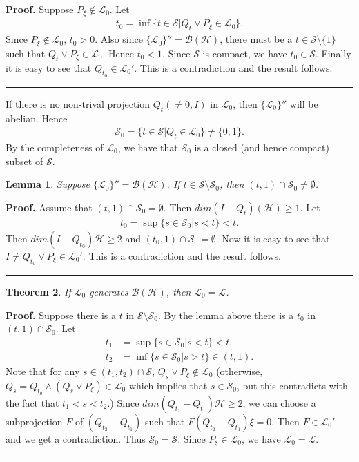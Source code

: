 \documentclass[12pt]{article}
\newtheorem{theorem}{Theorem}
\newtheorem{lemma}[theorem]{Lemma}
\newenvironment{proof}[1][Proof]{\textbf{#1.} }{\ \rule{0.5em}{0.5em}}
\newcommand{\BBB}{\mathcal B}
\newcommand{\HHH}{\mathscr H} %
\newcommand{\LLL}{\mathscr L} %
\newcommand{\SSS}{\mathcal S}
\newcommand{\PP}[1]{ P_{#1}} %
\newcommand{\QQ}[1]{ Q_{#1}}
\begin{document}
\noindent\begin{proof} Suppose $\PP {\xi} \notin \LLL_{0}$. Let
\begin{align*}
t_0 = \inf \{t \in \SSS | \QQ {t} \vee \PP {\xi }  \in \LLL_0 \}.
\end{align*}
Since $\PP {\xi} \notin \LLL_0$, $t_0 > 0$. Also since $\{ \LLL_{0}
\}'' = \BBB(\HHH)$, there must be a $t \in \SSS \setminus \{1 \}$
such that $\QQ {t} \vee \PP {\xi }  \in \LLL_0$. Hence $t_0 < 1$.
Since $\SSS$ is compact, we have $t_0 \in \SSS$. Finally it is easy
to see that $\QQ {t_0} \in \LLL_{0}'$. This is a contradiction and
the result follows. \end{proof}\newline

If there is no non-trival projection $\QQ {t}( \neq 0, I)$ in
$\LLL_{0}$, then $\{\LLL_{0} \}''$ will be abelian. Hence
\begin{align*} \SSS_0 = \{t \in \SSS | \QQ {t} \in \LLL_0 \} \neq
\{0, 1\}.
\end{align*}
By the completeness of $\LLL_0$, we have that $\SSS_0$ is a closed
(and hence compact) subset of $\SSS$.

\begin{lemma}
Suppose $\{ \LLL_{0} \}'' = \BBB(\HHH)$. If $t \in \SSS \setminus
\SSS_0$, then $(t, 1) \cap \SSS_0 \neq \emptyset$.
\end{lemma}

\noindent\begin{proof} Assume that $(t, 1) \cap \SSS_0 = \emptyset$.
Then $dim(I-\QQ {t})(\HHH) \geq 1$. Let
\begin{align*}
t_0 = \sup \{ s \in \SSS_0 | s < t \} < t.
\end{align*}
Then $dim(I-\QQ {t_0})\HHH \geq 2$ and $(t_0, 1) \cap \SSS_0 =
\emptyset$. Now it is easy to see that $I \neq \QQ {t_0} \vee \PP
{\xi } \in \LLL_{0}' $. This is a contradiction and the result
follows.
\end{proof}

\begin{theorem}
If $\LLL_0$ generates $\BBB(\HHH)$, then $\LLL_0 = \LLL$.
\end{theorem}

\noindent\begin{proof} Suppose there is a $t$ in $\SSS \setminus
\SSS_0$. By the lemma above there is a $t_0$ in $(t, 1) \cap
\SSS_0$. Let
\begin{align*}
t_1 &= \sup \{ s \in \SSS_0 | s < t \} < t, \\
t_2 &= \inf \{s \in \SSS_0 | s > t \} \in (t, 1).
\end{align*}
Note that for any $s \in (t_1, t_2) \cap \SSS$, $\QQ {s} \vee \PP
{\xi} \notin \LLL_0$ (otherwise, $\QQ {s} = \QQ {t_0} \wedge (\QQ
{s} \vee \PP {\xi}) \in \LLL_0$ which implies that $s \in \SSS_0$,
but this contradicts with the fact that $t_1 < s < t_2$.) Since $dim
(\QQ {t_2} - \QQ {t_1})\HHH \geq 2$, we can choose a subprojection
$F$ of $(\QQ {t_2} - \QQ {t_1})$ such that $F(\QQ {t_2} - \QQ
{t_1})\xi = 0$. Then $F \in \LLL_{0}'$ and we get a contradiction.
Thus $\SSS_0 = \SSS$. Since $\PP {\xi} \in \LLL_0$, we have $\LLL_0
= \LLL$.
\end{proof}\newline
\end{document}
